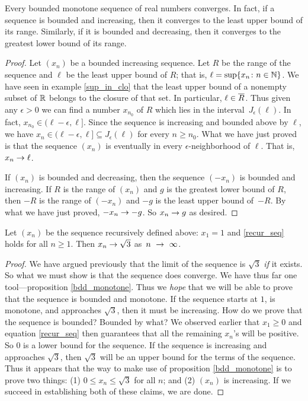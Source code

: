 \begin{prop}\label{bdd_monotone} Every bounded monotone sequence of real numbers converges.
In fact, if a sequence is bounded and increasing, then it converges to the least upper bound
of its range.  Similarly, if it is bounded and decreasing, then it converges to the greatest
lower bound of its range.
\end{prop}

\begin{proof} Let $(x_n)$ be a bounded increasing sequence.  Let $R$ be the range of the
sequence and $\ell$ be the least upper bound of $R$; that is, $\ell = \sup\{x_n \colon n \in
\mathbb{N}\}$. We have seen in example \ref{sup_in_clo} that the least upper bound of a nonempty
subset of $\mathbb{R}$ belongs to the closure of that set.  In particular, $\ell \in \overline{R}$. Thus
given any $\epsilon > 0$ we can find a number $x_{n_0}$ of $R$ which lies in the
interval~$J_\epsilon(\ell)$.  In fact, $x_{n_0} \in (\ell-\epsilon, \ell]$.  Since the
sequence is increasing and bounded above by $\ell$, we have $x_n \in (\ell-\epsilon, \ell]
\subseteq J_\epsilon(\ell)$ for every $n \ge n_0$.  What we have just proved is that the
sequence $(x_n)$ is eventually in every $\epsilon$-neighborhood of $\ell$.  That is, $x_n \rightarrow
\ell$.

If $(x_n)$ is bounded and decreasing, then the sequence $(-x_n)$ is bounded and increasing. If
$R$ is the range of $(x_n)$ and $g$ is the greatest lower bound of $R$, then $-R$ is the range
of $(-x_n)$ and $-g$ is the least upper bound of~$-R$.  By what we have just proved, $-x_n
\rightarrow -g$.  So $x_n \rightarrow g$ as desired.
\end{proof}

\begin{exam}\label{exam_recur} Let $(x_n)$ be the sequence recursively defined above: $x_1 = 1$
and \eqref{recur_seq} holds for all $n \ge 1$.  Then $x_n \rightarrow \sqrt3$ as~$n~\rightarrow~\infty$.
\end{exam}

\begin{proof} We have argued previously that the limit of the sequence is $\sqrt3$ \emph{if} it
exists.  So what we must show is that the sequence does converge.  We have thus far one
tool---proposition \ref{bdd_monotone}.  Thus we \emph{hope} that we will be able to prove that
the sequence is bounded and monotone. If the sequence starts at $1$, is monotone, and
approaches $\sqrt3$, then it must be increasing.  How do we prove that the sequence is
bounded?   Bounded by what?  We observed earlier that $x_1 \ge 0$ and equation
\eqref{recur_seq} then guarantees that all the remaining $x_n$'s will be positive.  So $0$ is
a lower bound for the sequence.  If the sequence is increasing and approaches $\sqrt 3$, then
$\sqrt3$ will be an upper bound for the terms of the sequence.  Thus it appears that the way
to make use of proposition \ref{bdd_monotone} is to prove two things: (1) $0 \le x_n \le
\sqrt3$ for all $n$; and (2) $(x_n)$ is increasing.  If we succeed in establishing both of
these claims, we are done.  \ns
\end{proof}

